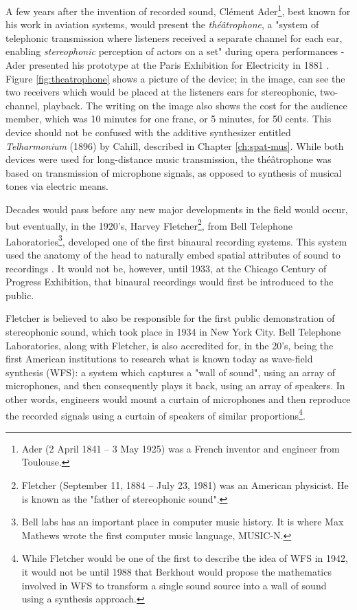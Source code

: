 A few years after the invention of recorded sound, Clément Ader\footnote{Ader (2 April 1841 – 3 May 1925) was a French inventor and engineer from Toulouse.}, best known for his work in aviation systems, would present the \textit{théâtrophone}, a "system of telephonic transmission where listeners received a separate channel for each ear, enabling \textit{stereophonic} perception of actors on a set" during opera performances - Ader presented his prototype at the Paris Exhibition for Electricity in 1881 \cite{malham19953}. Figure \ref{fig:theatrophone} shows a picture of the device; in the image, can see the two receivers which would be placed at the listeners ears for stereophonic, two-channel, playback. The writing on the image also shows the cost for the audience member, which was 10 minutes for one franc, or 5 minutes, for 50 cents. This device should not be confused with the additive synthesizer entitled \textit{Telharmonium} (1896) by Cahill, described in Chapter \ref{ch:spat-mus}. While both devices were used for long-distance music transmission, the théâtrophone was based on transmission of microphone signals, as opposed to synthesis of musical tones via electric means. 

Decades would pass before any new major developments in the field would occur, but eventually, in the 1920's, Harvey Fletcher\footnote{Fletcher (September 11, 1884 – July 23, 1981) was an American physicist. He is known as the "father of stereophonic sound".}, from Bell Telephone Laboratories\footnote{Bell labs has an important place in computer music history. It is where Max Mathews wrote the first computer music language, MUSIC-N.}, developed one of the first binaural recording systems. This system used the anatomy of the head to naturally embed spatial attributes of sound to recordings \cite{harvey1927binaural}. It would not be, however, until 1933, at the Chicago Century of Progress Exhibition, that binaural recordings would first be introduced to the public. 

Fletcher is believed to also be responsible for the first public demonstration of stereophonic sound, which took place in 1934 in New York City. Bell Telephone Laboratories, along with Fletcher, is also accredited for, in the 20's, being the first American institutions to research what is known today as wave-field synthesis (WFS): a system which captures a "wall of sound", using an array of microphones, and then consequently plays it back, using an array of speakers. In other words, engineers would mount a curtain of microphones and then reproduce the recorded signals using a curtain of speakers of similar proportions\cite{fletcher1942hearing}\footnote{While Fletcher would be one of the first to describe the idea of WFS in 1942, it would not be until 1988 that Berkhout would propose the mathematics involved in WFS to transform a single sound source into a wall of sound using a synthesis approach.}.


